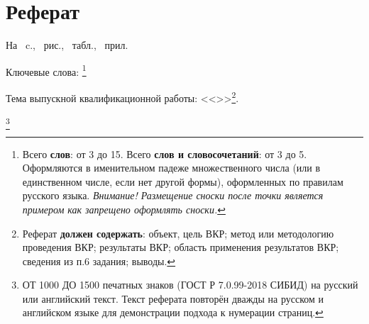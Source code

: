 \chapter*[Count-me]{Реферат} %
\thispagestyle{empty}%
%
%




На ~c.,  
~{рис.},
~{табл.},
~{прил.}%



{Ключевые слова: \keywordsRu}\footnote{Всего \textbf{слов}: от 3 до 15. Всего \textbf{слов и словосочетаний}: от 3 до 5. Оформляются в именительном падеже множественного числа (или в единственном числе, если нет другой формы), оформленных по правилам русского языка. \textit{Внимание! Размещение сноски после точки является примером как запрещено оформлять сноски.}} %

Тема выпускной квалификационной работы: <<\thesisTitle>>\footnote{Реферат \textbf{должен содержать}: объект, цель ВКР; метод или методологию проведения ВКР; результаты ВКР; область применения результатов ВКР; сведения из п.6 задания; выводы.}. %


\abstractRu\footnote{ОТ 1000 ДО 1500 печатных знаков (ГОСТ Р 7.0.99-2018 СИБИД) на русский или английский текст. Текст реферата повторён дважды на русском и английском языке для демонстрации подхода к нумерации страниц.} %

